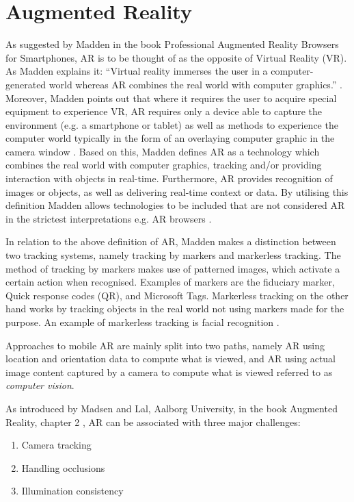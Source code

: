 \section{Augmented Reality}
As suggested by Madden in the book Professional Augmented Reality Browsers for Smartphones, AR is to be thought of as the opposite of Virtual Reality (VR). As Madden explains it: “Virtual reality immerses the user in a computer-generated world whereas AR combines the real world with computer graphics.” \cite{Madden2011}. Moreover, Madden points out that where it requires the user to acquire special equipment to experience VR, AR requires only a device able to capture the environment (e.g. a smartphone or tablet) as well as methods to experience the computer world typically in the form of an overlaying computer graphic in the camera window \cite{Madden2011}. Based on this, Madden defines AR as a technology which combines the real world with computer graphics, tracking and/or providing interaction with objects in real-time. Furthermore, AR provides recognition of images or objects, as well as delivering real-time context or data. By utilising this definition Madden allows technologies to be included that are not considered AR in the strictest interpretations e.g. AR browsers \cite{Madden2011}.

In relation to the above definition of AR, Madden makes a distinction between two tracking systems, namely tracking by markers and markerless tracking. The method of tracking by markers makes use of patterned images, which activate a certain action when recognised. Examples of markers are the fiduciary marker, Quick response codes (QR), and Microsoft Tags. Markerless tracking on the other hand works by tracking objects in the real world not using markers made for the purpose. An example of markerless tracking is facial recognition \cite{Madden2011}.

Approaches to mobile AR are mainly split into two paths, namely AR using location and orientation data to compute what is viewed, and AR using actual image content captured by a camera to compute what is viewed referred to as \textit{computer vision}.

As introduced by Madsen and Lal, Aalborg University, in the book Augmented Reality, chapter 2 \cite{Lal2010}, AR can be associated with three major challenges:

\begin{enumerate}
\item Camera tracking 
\item Handling occlusions
\item Illumination consistency
\end{enumerate}

